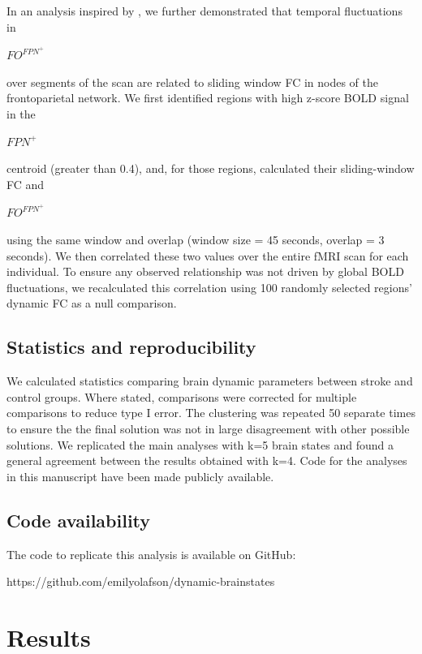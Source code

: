 \documentclass[phd,tocprelim]{cornell}
\begin{document}
    In an analysis inspired by \cite{Baker2014-zt}, we further demonstrated that temporal fluctuations in  \begin{Large}$FO^{FPN^+}$ \end{Large} over segments of the scan are related to sliding window FC in nodes of the frontoparietal network. We first identified regions with high z-score BOLD signal in the  \begin{Large}$FPN^+$ \end{Large} centroid (greater than 0.4), and, for those regions, calculated their sliding-window FC and  \begin{Large}$FO^{FPN^+}$ \end{Large} using the same window and overlap (window size = 45 seconds, overlap = 3 seconds). We then correlated these two values over the entire fMRI scan for each individual. To ensure any observed relationship was not driven by global BOLD fluctuations, we recalculated this correlation using 100 randomly selected regions' dynamic FC as a null comparison.
    
    \subsection{Statistics and reproducibility}
    We calculated statistics comparing brain dynamic parameters between stroke and control groups. Where stated, comparisons were corrected for multiple comparisons to reduce type I error. The clustering was repeated 50 separate times to ensure the the final solution was not in large disagreement with other possible solutions. We replicated the main analyses with k=5 brain states and found a general agreement between the results obtained with k=4. Code for the analyses in this manuscript have been made publicly available. 
    
	\subsection{Code availability}
	 The code to replicate this analysis is available on GitHub: 
	 
	 https://github.com/emilyolafson/dynamic-brainstates
	 
\section{Results}
\end{document}
